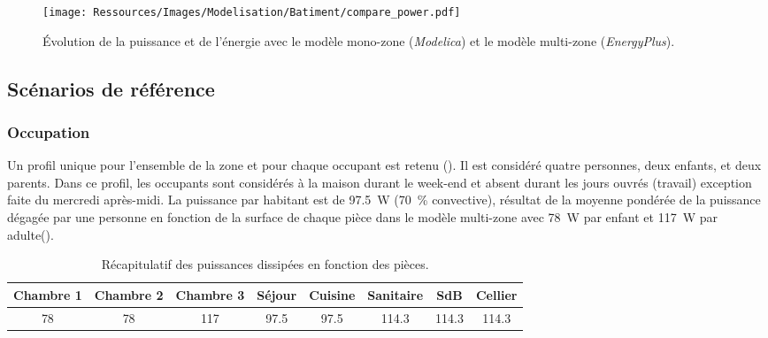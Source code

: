 \begin{figure}
    \centering
    \texttt{[image: Ressources/Images/Modelisation/Batiment/compare\_power.pdf]}
    \caption[Comparatif de l’évolution entre le modèle mono-zone et multi-zone]
             {Évolution de la puissance et de l’énergie avec le modèle mono-zone
              (\textit{Modelica}) et le modèle multi-zone (\textit{EnergyPlus}).}
    \label{fig:compare_models}
\end{figure}


\subsection{Scénarios de référence} %
\label{sub:scenarios_de_reference}
\subsubsection{Occupation} %
\label{ssub:profil_d_occupation}
Un profil unique pour l’ensemble de la zone et pour chaque occupant est retenu
(). Il est considéré quatre personnes, deux enfants, et deux parents. Dans ce profil,
les occupants sont considérés à la maison durant le week-end et absent durant les jours
ouvrés (travail) exception faite du mercredi après-midi.
La puissance par habitant est de \SI{97.5}{\watt} (\SI{70}{\percent} convective), résultat
de la moyenne pondérée de la puissance dégagée par une personne en fonction de la surface
de chaque pièce dans le modèle multi-zone avec \SI{78}{\watt} par enfant
et \SI{117}{\watt} par adulte().

\begin{table}
\centering
\caption{Récapitulatif des puissances dissipées en fonction des pièces.}
\label{tab:puissance_occupants}
\begin{tabular}{*8{c}}
    \toprule
    Chambre 1 & Chambre 2  & Chambre 3 & Séjour     & Cuisine    & Sanitaire   & SdB         & Cellier     \\
    \midrule
    \num{78}  & \num{78}   & \num{117} & \num{97.5} & \num{97.5} & \num{114.3} & \num{114.3} & \num{114.3} \\
    \bottomrule
\end{tabular}
\end{table}


